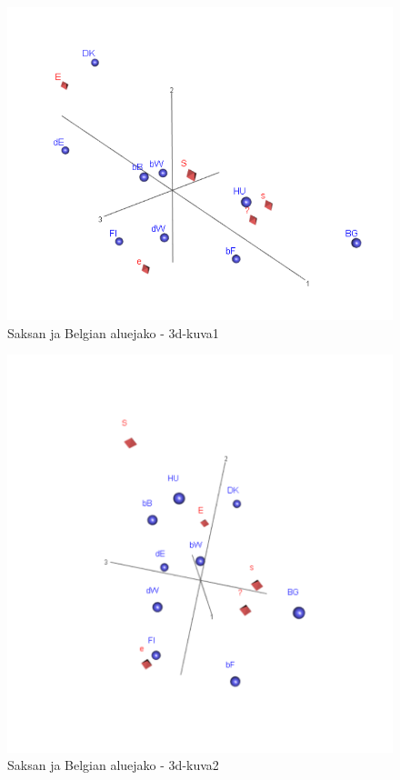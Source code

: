 \documentclass[
  finnish,
]{book}
\begin{document}
\begin{figure}

{\centering \includegraphics[width=0.9\linewidth]{img/3dSymMap_1} 

}

\caption{Saksan ja  Belgian aluejako - 3d-kuva1}\label{fig:3dklippi1}
\end{figure}

\begin{figure}

{\centering \includegraphics[width=0.9\linewidth]{img/3dSymMap_2} 

}

\caption{Saksan ja  Belgian aluejako - 3d-kuva2}\label{fig:3dklippi2}
\end{figure}
\end{document}
